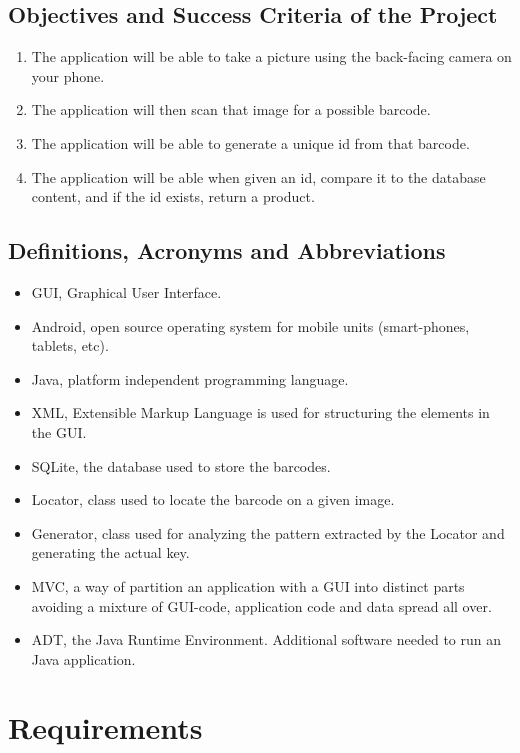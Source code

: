 \documentclass{report}
\begin{document}
\section{Objectives and Success Criteria of the Project}

\begin{enumerate}
  \item The application will be able to take a picture using the back-facing camera on your phone.
  \item The application will then scan that image for a possible barcode.
  \item The application will be able to generate a unique id from that barcode.
  \item The application will be able when given an id, compare it to the database content, and if the id exists, return a product.
\end{enumerate}

\section{Definitions, Acronyms and Abbreviations}

\begin{itemize}
    \item{GUI}, Graphical User Interface.
    \item{Android}, open source operating system for mobile units (smart-phones, tablets, etc).
    \item{Java}, platform independent programming language.
    \item{XML}, Extensible Markup Language is used for structuring the elements in the GUI.
    \item{SQLite}, the database used to store the barcodes.
    \item{Locator}, class used to locate the barcode on a given image.
    \item{Generator}, class used for analyzing the pattern extracted by the Locator and generating the actual key.
    \item{MVC}, a way of partition an application with a GUI into distinct parts avoiding a mixture of GUI-code, application code and data spread all over.
    \item{ADT}, the Java Runtime Environment. Additional software needed to run an Java application.
\end{itemize}

\chapter{Requirements}
\end{document}
